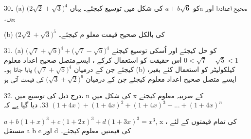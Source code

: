 30۔  (a)
 \( {(2\sqrt{2}+\sqrt{3}})^{4}\)
کو
 \( a+b\sqrt{6}\)
کی شکل میں توسیع کیجئے۔ یہاںa اور bصحیح اعداد ہیں۔
 
(b)
  \( {(2\sqrt{2}+\sqrt{3}})^{5}\)
کی بالکل صحیح قیمت معلو م کیجئے۔ 

31.
(a)
   \({(\sqrt{7}+\sqrt{5}})^{4}+ {(\sqrt{7}-\sqrt{5}})^{4}\)
کو حل کیجئے اور اُسکی توسیع کیجئے
   \( 0<\sqrt{7}-\sqrt{5}<1\)
اس حقیقت کو استعمال کرکے ، ایسےمتصل صحیح اعداد معلوم کیجئے جن کے درمیان 
    \({(\sqrt{7}+\sqrt{5}})^{4}\)
پایا جاتا ہو۔ 
(b)
کیلکولیٹر کو استعمال کئے بغیر،   ایسے متصل  صحیح اعداد معلوم کیجئے جن کے درمیان 
\( {(\sqrt{3}+\sqrt{2}})^{6}\)
کی قیمت آتی ہو

32.
درج ذیل کی توسیع میں، n  کی شکل میں      x  کے ضربیہ معلوم کیجئے
\({(1+4x)}+{(1+4x)^{2}}+{(1+4x)^{3}}+...+{(1+4x)^{n}}\)
33.
دیا گیا ہے کہ 

\( {a}+{b(1+x)^{3}}+{c(1+2x)^{3}}+{d(1+3x)^{3}}={x}^{3}\), 
x
 کی تمام قیمتوں کے لئے ،  مستقل a   b c            اور       d  کی قیمتیں معلوم کیجئے۔
